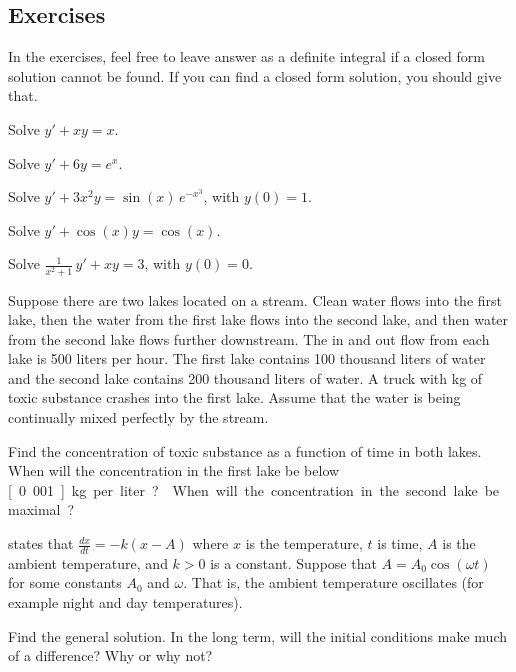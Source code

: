\subsection{Exercises}

In the exercises, feel free to leave answer as a definite integral if a
closed form solution cannot be found.  If you can find a closed form
solution, you should give that.

\begin{exercise}
Solve $y' + xy = x$.
\end{exercise}

\begin{exercise}
Solve $y' + 6y = e^x$.
\end{exercise}

\begin{exercise}
Solve $y' + 3x^2y = \sin(x) \, e^{-x^3}$, with $y(0) = 1$.
\end{exercise}

\begin{exercise}
Solve $y' + \cos (x) y = \cos(x)$.
\end{exercise}

\begin{exercise}
Solve $\frac{1}{x^2+1} \, y' + x y = 3$, with $y(0) = 0$.
\end{exercise}

\begin{exercise}
Suppose there are two lakes located on a stream.  Clean
water flows into the first lake,
then the water from the first lake flows into the second lake, and then
water from the second lake flows further downstream.
The in and out flow from each lake is 500 liters per hour.
The first lake contains 100 thousand liters of water and the
second lake contains 200 thousand liters of water.
A truck with \unit[500]{kg} of toxic substance
crashes into the first lake.  Assume that the water is being continually
mixed perfectly by the stream.
\begin{tasks}
\task Find the concentration of toxic substance
as a function of time in both lakes.
\task When will the
concentration in the first lake be below \unit[0.001]{kg} per liter?
\task When will the
concentration in the second lake be maximal?
\end{tasks}
\end{exercise}

\begin{exercise}
 states that $\frac{dx}{dt} = -k(x-A)$ where
$x$ is the temperature, $t$ is time, $A$ is the ambient temperature,
and $k > 0$ is a constant.
Suppose that $A = A_0 \cos (\omega t)$ for some constants $A_0$ and $\omega$.
That is, the ambient temperature oscillates (for example night and day
temperatures).
\begin{tasks}
\task Find the general solution.
\task In the long term, will the
initial conditions make much of a difference?  Why or why not?
\end{tasks}
\end{exercise}

